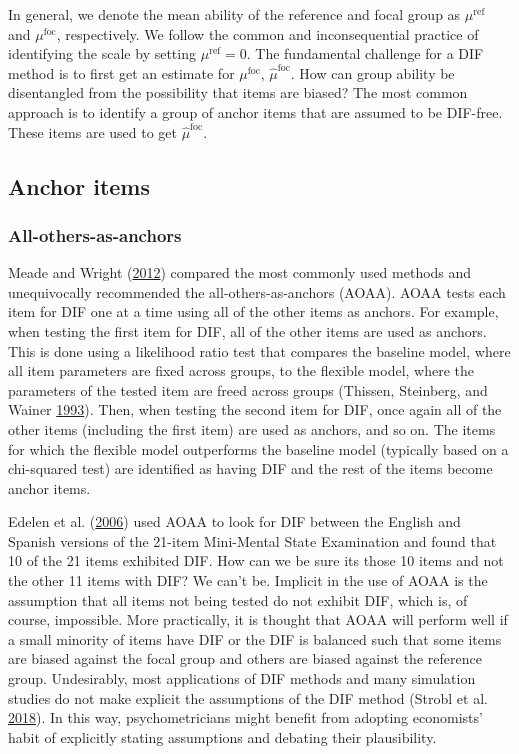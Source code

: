 \documentclass[
  11pt,
]{article}
\begin{document}
In general, we denote the mean ability of the reference and focal group as \(\mu^\text{ref}\) and \(\mu^\text{foc}\), respectively. We follow the common and inconsequential practice of identifying the scale by setting \(\mu^\text{ref} = 0\). The fundamental challenge for a DIF method is to first get an estimate for \(\mu^\text{foc}\), \(\hat\mu^\text{foc}\). How can group ability be disentangled from the possibility that items are biased? The most common approach is to identify a group of anchor items that are assumed to be DIF-free. These items are used to get \(\hat\mu^\text{foc}\).

\hypertarget{anchor-items}{%
\subsection{Anchor items}\label{anchor-items}}

\hypertarget{all-others-as-anchors}{%
\subsubsection{All-others-as-anchors}\label{all-others-as-anchors}}

Meade and Wright (\protect\hyperlink{ref-meade2012solving}{2012}) compared the most commonly used methods and unequivocally recommended the all-others-as-anchors (AOAA). AOAA tests each item for DIF one at a time using all of the other items as anchors. For example, when testing the first item for DIF, all of the other items are used as anchors. This is done using a likelihood ratio test that compares the baseline model, where all item parameters are fixed across groups, to the flexible model, where the parameters of the tested item are freed across groups (Thissen, Steinberg, and Wainer \protect\hyperlink{ref-thissen1993detection}{1993}). Then, when testing the second item for DIF, once again all of the other items (including the first item) are used as anchors, and so on. The items for which the flexible model outperforms the baseline model (typically based on a chi-squared test) are identified as having DIF and the rest of the items become anchor items.

Edelen et al. (\protect\hyperlink{ref-edelen2006identification}{2006}) used AOAA to look for DIF between the English and Spanish versions of the 21-item Mini-Mental State Examination and found that 10 of the 21 items exhibited DIF. How can we be sure its those 10 items and not the other 11 items with DIF? We can't be. Implicit in the use of AOAA is the assumption that all items not being tested do not exhibit DIF, which is, of course, impossible. More practically, it is thought that AOAA will perform well if a small minority of items have DIF or the DIF is balanced such that some items are biased against the focal group and others are biased against the reference group. Undesirably, most applications of DIF methods and many simulation studies do not make explicit the assumptions of the DIF method (Strobl et al. \protect\hyperlink{ref-strobl2018anchor}{2018}). In this way, psychometricians might benefit from adopting economists' habit of explicitly stating assumptions and debating their plausibility.
\end{document}
